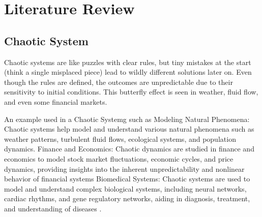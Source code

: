 \documentclass[11pt]{article}
\begin{document}
\section{Literature Review}

\subsection{Chaotic System}
Chaotic systems are like puzzles with clear rules, but tiny mistakes at the start (think a single misplaced piece) lead to wildly different solutions later on. Even though the rules are defined, the outcomes are unpredictable due to their sensitivity to initial conditions. This butterfly effect is seen in weather, fluid flow, and even some financial markets.

An example used in a Chaotic Systemg such as Modeling Natural Phenomena: Chaotic systems help model and understand various natural phenomena such as weather patterns, turbulent fluid flows, ecological systems, and population dynamics.\cite{may_simple_1976}
Finance and Economics: Chaotic dynamics are studied in finance and economics to model stock market fluctuations, economic cycles, and price dynamics, providing insights into the inherent unpredictability and nonlinear behavior of financial systems \cite{mandelbrot_variation_1962}
Biomedical Systems: Chaotic systems are used to model and understand complex biological systems, including neural networks, cardiac rhythms, and gene regulatory networks, aiding in diagnosis, treatment, and understanding of diseases \cite{izhikevich_neural_2000}.
\end{document}

